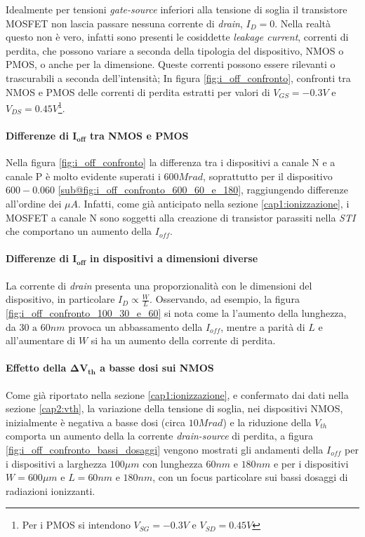 Idealmente per tensioni \textit{gate-source} inferiori alla tensione di soglia il transistore MOSFET non lascia passare nessuna corrente di \textit{drain}, $I_D = 0$. Nella realtà questo non è vero, infatti sono presenti le cosiddette \textit{leakage current}, correnti di perdita, che possono variare a seconda della tipologia del dispositivo, NMOS o PMOS, o anche per la dimensione.
Queste correnti possono essere rilevanti o trascurabili a seconda dell'intensità; In figura \ref{fig:i_off_confronto}, confronti tra NMOS e PMOS delle correnti di perdita estratti per valori di $V_{GS} = -0.3V$ e $V_{DS} = 0.45V$\footnote{Per i PMOS si intendono $V_{SG} = -0.3V$ e $V_{SD} = 0.45V$}.

\paragraph*{Differenze di $\bm{I_{off}}$ tra NMOS e PMOS} Nella figura \ref{fig:i_off_confronto} la differenza tra i dispositivi a canale N e a canale P è molto evidente superati i $600Mrad$, soprattutto per il dispositivo $600-0.060$ \ref{sub@fig:i_off_confronto_600_60_e_180}, raggiungendo differenze all'ordine dei $\mu A$. Infatti, come già anticipato nella sezione \ref{cap1:ionizzazione}, i MOSFET a canale N sono soggetti alla creazione di transistor parassiti nella \textit{STI} che comportano un aumento della $I_{off}$.

\paragraph*{Differenze di $\bm{I_{off}}$ in dispositivi a dimensioni diverse} La corrente di \textit{drain} presenta una proporzionalità con le dimensioni del dispositivo, in particolare $I_{D} \propto \frac{W}{L}$. Osservando, ad esempio, la figura \ref{fig:i_off_confronto_100_30_e_60} si nota come la l'aumento della lunghezza, da $30 \text{ a } 60nm$ provoca un abbassamento della $I_{off}$, mentre a parità di $L$ e all'aumentare di $W$ si ha un aumento della corrente di perdita.

\paragraph*{Effetto della $\bm{\Delta V_{th}}$ a basse dosi sui NMOS} Come già riportato nella sezione \ref{cap1:ionizzazione}, e confermato dai dati nella sezione \ref{cap2:vth}, la variazione della tensione di soglia, nei dispositivi NMOS, inizialmente è negativa a basse dosi (circa $10Mrad$) e la riduzione della $V_{th}$ comporta un aumento della la corrente \textit{drain-source} di perdita, a figura \ref{fig:i_off_confronto_bassi_dosaggi} vengono mostrati gli andamenti della $I_{off}$ per i dispositivi a larghezza $100\mu m$ con lunghezza $60 nm \text{ e } 180nm$ e per i dispositivi $W = 600\mu m$ e $L = 60 nm \text{ e } 180nm$, con un focus particolare sui bassi dosaggi di radiazioni ionizzanti.

